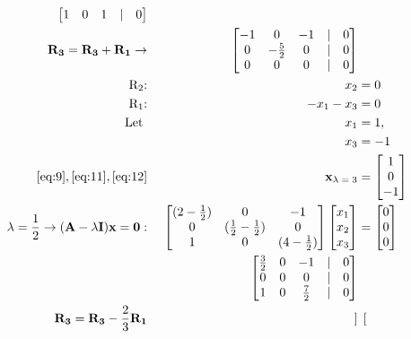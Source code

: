 \documentclass{article}
\begin{document}
\begin{align}
\begin{bmatrix}
    1 & 0 & 1 &|& 0 \end{bmatrix} &\text{ }
    \\
    \label{eq:8}
    \textbf{R\textsubscript{3}} = \textbf{R\textsubscript{3}} + \textbf{R\textsubscript{1}} \rightarrow &&  \begin{bmatrix} 
    -1 & 0 & -1 &|& 0\\
    0 & -\frac{5}{2} & 0 &|& 0\\
    0 & 0 & 0 &|& 0 \end{bmatrix} &\text{ }
    \\
    \label{eq:9}
    \text{R\textsubscript{2}:} && x_2 &= 0
    \\
    \label{eq:10} 
    \text{R\textsubscript{1}:} && -x_1 -x_3 &= 0
    \\
    \label{eq:11}
    \text{Let } && x_1 &= 1,
    \\
    \label{eq:12}
    && x_3 &= -1
    \\
    \label{eq:13}
    \eqref{eq:9}, \eqref{eq:11}, \eqref{eq:12} && \textbf{x\textsubscript{$\lambda=3$}} &= \begin{bmatrix} 1\\0\\-1 \end{bmatrix} 
    \\
    \label{eq:14}
    \lambda=\frac{1}{2} \rightarrow (\textbf{A}-\lambda\textbf{I})\textbf{x}=\textbf{0}: && 
    \begin{bmatrix}
    (2-\frac{1}{2}) & 0 & -1\\
    0 & (\frac{1}{2}-\frac{1}{2}) & 0\\
    1 & 0 & (4-\frac{1}{2})
    \end{bmatrix} \begin{bmatrix}
    x_1\\x_2\\x_3
    \end{bmatrix} &= \begin{bmatrix}
    0\\0\\0
    \end{bmatrix}
    \\
    \label{eq:15}
    &&\begin{bmatrix}
    \frac{3}{2} & 0 & -1 &|& 0\\
    0 & 0 & 0 &|& 0\\
    1 & 0 & \frac{7}{2} &|& 0
    \end{bmatrix} &\text{ }
    \\
    \label{eq:16}
    \textbf{R\textsubscript{3}} = \textbf{R\textsubscript{3}} - \frac{2}{3}\textbf{R\textsubscript{1}} && \begin{bmatrix}

\end{bmatrix}
\end{align}
\end{document}
